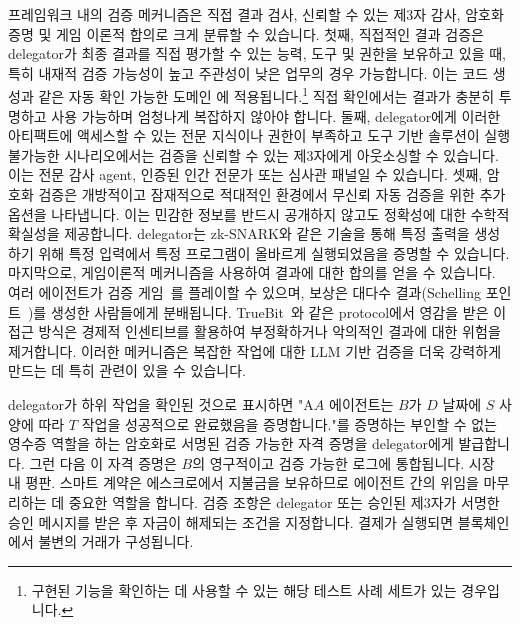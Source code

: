 \documentclass[11pt, a4paper, twocolumn, copyright, goog]{google}
\begin{document}
프레임워크 내의 검증 메커니즘은 직접 결과 검사, 신뢰할 수 있는 제3자 감사, 암호화 증명 및 게임 이론적 합의로 크게 분류할 수 있습니다. 첫째, 직접적인 결과 검증은 delegator가 최종 결과를 직접 평가할 수 있는 능력, 도구 및 권한을 보유하고 있을 때, 특히 내재적 검증 가능성이 높고 주관성이 낮은 업무의 경우 가능합니다. 이는 코드 생성과 같은 자동 확인 가능한 도메인 \citep{li2024llms}에 적용됩니다.\footnote{구현된 기능을 확인하는 데 사용할 수 있는 해당 테스트 사례 세트가 있는 경우입니다.} 직접 확인에서는 결과가 충분히 투명하고 사용 가능하며 엄청나게 복잡하지 않아야 합니다. 둘째, delegator에게 이러한 아티팩트에 액세스할 수 있는 전문 지식이나 권한이 부족하고 도구 기반 솔루션이 실행 불가능한 시나리오에서는 검증을 신뢰할 수 있는 제3자에게 아웃소싱할 수 있습니다. 이는 전문 감사 agent, 인증된 인간 전문가 또는 심사관 패널일 수 있습니다. 셋째, 암호화 검증은 개방적이고 잠재적으로 적대적인 환경에서 무신뢰 자동 검증을 위한 추가 옵션을 나타냅니다. 이는 민감한 정보를 반드시 공개하지 않고도 정확성에 대한 수학적 확실성을 제공합니다. delegator는 zk-SNARK와 같은 기술을 통해 특정 출력을 생성하기 위해 특정 입력에서 특정 프로그램이 올바르게 실행되었음을 증명할 수 있습니다. 마지막으로, 게임이론적 메커니즘을 사용하여 결과에 대한 합의를 얻을 수 있습니다. 여러 에이전트가 검증 게임~\citep{teutsch2024scalable}를 플레이할 수 있으며, 보상은 대다수 결과(Schelling 포인트~\citep{pastine2017introducing})를 생성한 사람들에게 분배됩니다. TrueBit~\citep{teutsch2018truebit}와 같은 protocol에서 영감을 받은 이 접근 방식은 경제적 인센티브를 활용하여 부정확하거나 악의적인 결과에 대한 위험을 제거합니다. 이러한 메커니즘은 복잡한 작업에 대한 LLM 기반 검증을 더욱 강력하게 만드는 데 특히 관련이 있을 수 있습니다.

delegator가 하위 작업을 확인된 것으로 표시하면 "A$A$ 에이전트는 $B$가 $D$ 날짜에 $S$ 사양에 따라 $T$ 작업을 성공적으로 완료했음을 증명합니다."를 증명하는 부인할 수 없는 영수증 역할을 하는 암호화로 서명된 검증 가능한 자격 증명을 delegator에게 발급합니다. 그런 다음 이 자격 증명은 $B$의 영구적이고 검증 가능한 로그에 통합됩니다. 시장 내 평판. 스마트 계약은 에스크로에서 지불금을 보유하므로 에이전트 간의 위임을 마무리하는 데 중요한 역할을 합니다. 검증 조항은 delegator 또는 승인된 제3자가 서명한 승인 메시지를 받은 후 자금이 해제되는 조건을 지정합니다. 결제가 실행되면 블록체인에서 불변의 거래가 구성됩니다.
\end{document}
